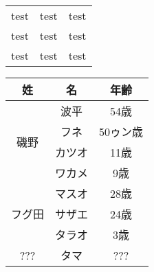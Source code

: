     \begin{tabular}{lrr}
      test & test & test \\
      test & test & test \\
      test & test & test \\
    \end{tabular}
    \begin{tabular}{|c|c|c|} \hline
        姓 & 名 & 年齢 \\ \hline
        \multirow{4}{*}{磯野} & 波平 & 54歳 \\
        & フネ & 50ゥン歳 \\
        & カツオ & 11歳 \\
        & ワカメ & 9歳 \\ \hline
        \multirow{3}{*}{フグ田} & マスオ & 28歳 \\
        & サザエ & 24歳 \\
        & タラオ & 3歳 \\ \hline
        ??? & タマ & ??? \\ \hline
    \end{tabular}
%
%
%
